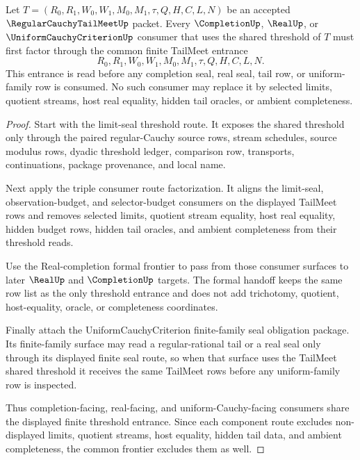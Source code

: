 \begin{theorem}
\label{thm:regular-cauchy-tail-meet-completion-uniform-frontier}
Let $T=(R_0,R_1,W_0,W_1,M_0,M_1,\tau,Q,H,C,L,N)$ be an accepted $\RegularCauchyTailMeetUp$ packet. Every $\CompletionUp$, $\RealUp$, or $\UniformCauchyCriterionUp$ consumer that uses the shared threshold of $T$ must first factor through the common finite TailMeet entrance
$$
R_0,R_1,W_0,W_1,M_0,M_1,\tau,Q,H,C,L,N.
$$
This entrance is read before any completion seal, real seal, tail row, or uniform-family row is consumed. No such consumer may replace it by selected limits, quotient streams, host real equality, hidden tail oracles, or ambient completeness.
\end{theorem}
\begin{proof}
Start with the limit-seal threshold route. It exposes the shared threshold only through the paired regular-Cauchy source rows, stream schedules, source modulus rows, dyadic threshold ledger, comparison row, transports, continuations, package provenance, and local name.

Next apply the triple consumer route factorization. It aligns the limit-seal, observation-budget, and selector-budget consumers on the displayed TailMeet rows and removes selected limits, quotient stream equality, host real equality, hidden budget rows, hidden tail oracles, and ambient completeness from their threshold reads.

Use the Real-completion formal frontier to pass from those consumer surfaces to later $\RealUp$ and $\CompletionUp$ targets. The formal handoff keeps the same row list as the only threshold entrance and does not add trichotomy, quotient, host-equality, oracle, or completeness coordinates.

Finally attach the UniformCauchyCriterion finite-family seal obligation package. Its finite-family surface may read a regular-rational tail or a real seal only through its displayed finite seal route, so when that surface uses the TailMeet shared threshold it receives the same TailMeet rows before any uniform-family row is inspected.

Thus completion-facing, real-facing, and uniform-Cauchy-facing consumers share the displayed finite threshold entrance. Since each component route excludes non-displayed limits, quotient streams, host equality, hidden tail data, and ambient completeness, the common frontier excludes them as well.
\end{proof}

